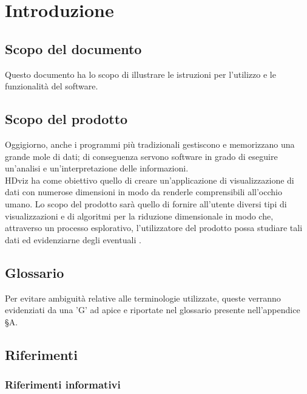 \section{Introduzione}
\subsection{Scopo del documento}
Questo documento ha lo scopo di illustrare le istruzioni per l'utilizzo e le funzionalità del software.

\subsection{Scopo del prodotto}
Oggigiorno, anche i programmi più tradizionali gestiscono e memorizzano una grande mole di dati; di conseguenza servono software in grado di eseguire un'analisi e un'interpretazione delle informazioni.\\
HDviz ha come obiettivo quello di creare un'applicazione di visualizzazione di dati con numerose dimensioni in modo da renderle comprensibili all'occhio umano.  Lo scopo del prodotto sarà quello di fornire all'utente diversi tipi di visualizzazioni e di algoritmi per la riduzione dimensionale in modo che, attraverso un processo esplorativo, l'utilizzatore del prodotto possa studiare tali dati ed evidenziarne degli eventuali . 

\subsection{Glossario}
Per evitare ambiguità relative alle terminologie utilizzate, queste verranno evidenziati da una 'G' ad apice e riportate nel glossario presente nell'appendice \S A.

\subsection{Riferimenti}

\subsubsection{Riferimenti informativi}
\label{riferimenti}
